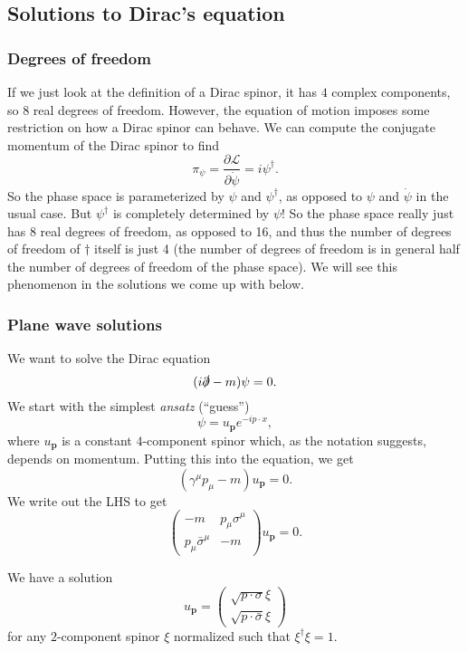 \documentclass[a4paper]{article}
\begin{document}
\subsection{Solutions to Dirac's equation}
\subsubsection*{Degrees of freedom}
If we just look at the definition of a Dirac spinor, it has $4$ complex components, so $8$ real degrees of freedom. However, the equation of motion imposes some restriction on how a Dirac spinor can behave. We can compute the conjugate momentum of the Dirac spinor to find
\[
  \pi_\psi = \frac{\partial \mathcal{L}}{\partial \dot\psi} = i \psi^\dagger.
\]
So the phase space is parameterized by $\psi$ and $\psi^\dagger$, as opposed to $\psi$ and $\dot\psi$ in the usual case. But $\psi^\dagger$ is completely determined by $\psi$! So the phase space really just has 8 real degrees of freedom, as opposed to 16, and thus the number of degrees of freedom of $\dagger$ itself is just 4 (the number of degrees of freedom is in general half the number of degrees of freedom of the phase space). We will see this phenomenon in the solutions we come up with below. %

\subsubsection*{Plane wave solutions}
We want to solve the Dirac equation
\[
  (i \slashed \partial - m) \psi = 0.
\]
We start with the simplest \emph{ansatz} (``guess'')
\[
  \psi = u_\mathbf{p} e^{- i p \cdot x},
\]
where $u_\mathbf{p}$ is a constant $4$-component spinor which, as the notation suggests, depends on momentum. Putting this into the equation, we get
\[
  (\gamma^\mu p_\mu - m) u_\mathbf{p} = 0.
\]
We write out the LHS to get
\[
  \begin{pmatrix}
    -m & p_\mu \sigma^\mu\\
    p_\mu \bar\sigma^\mu & -m
  \end{pmatrix} u_\mathbf{p} = 0.
\]
\begin{prop}
  We have a solution
  \[
    u_\mathbf{p} =
    \begin{pmatrix}
      \sqrt{p \cdot \sigma} \xi\\
      \sqrt{p \cdot \bar\sigma} \xi
    \end{pmatrix}
  \]
  for any $2$-component spinor $\xi$ normalized such that $\xi^\dagger \xi = 1$.
\end{prop}
\end{document}

